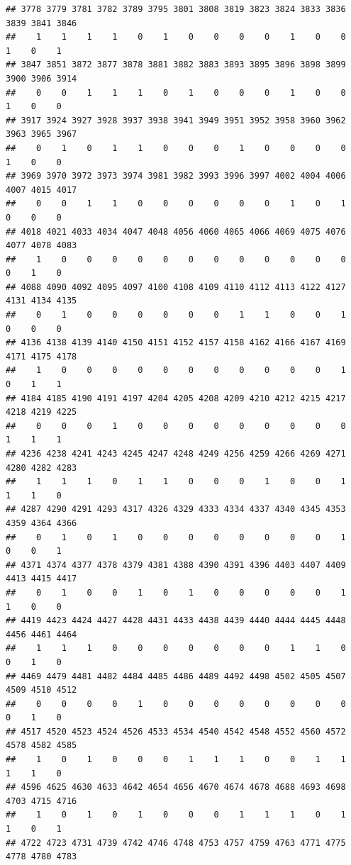 \documentclass[
]{article}
\begin{document}
\begin{verbatim}
## 3778 3779 3781 3782 3789 3795 3801 3808 3819 3823 3824 3833 3836 3839 3841 3846 
##    1    1    1    1    0    1    0    0    0    0    1    0    0    1    0    1 
## 3847 3851 3872 3877 3878 3881 3882 3883 3893 3895 3896 3898 3899 3900 3906 3914 
##    0    0    1    1    1    0    1    0    0    0    1    0    0    1    0    0 
## 3917 3924 3927 3928 3937 3938 3941 3949 3951 3952 3958 3960 3962 3963 3965 3967 
##    0    1    0    1    1    0    0    0    1    0    0    0    0    1    0    0 
## 3969 3970 3972 3973 3974 3981 3982 3993 3996 3997 4002 4004 4006 4007 4015 4017 
##    0    0    1    1    0    0    0    0    0    0    1    0    1    0    0    0 
## 4018 4021 4033 4034 4047 4048 4056 4060 4065 4066 4069 4075 4076 4077 4078 4083 
##    1    0    0    0    0    0    0    0    0    0    0    0    0    0    1    0 
## 4088 4090 4092 4095 4097 4100 4108 4109 4110 4112 4113 4122 4127 4131 4134 4135 
##    0    1    0    0    0    0    0    0    1    1    0    0    1    0    0    0 
## 4136 4138 4139 4140 4150 4151 4152 4157 4158 4162 4166 4167 4169 4171 4175 4178 
##    1    0    0    0    0    0    0    0    0    0    0    0    1    0    1    1 
## 4184 4185 4190 4191 4197 4204 4205 4208 4209 4210 4212 4215 4217 4218 4219 4225 
##    0    0    0    1    0    0    0    0    0    0    0    0    0    1    1    1 
## 4236 4238 4241 4243 4245 4247 4248 4249 4256 4259 4266 4269 4271 4280 4282 4283 
##    1    1    1    0    1    1    0    0    0    1    0    0    1    1    1    0 
## 4287 4290 4291 4293 4317 4326 4329 4333 4334 4337 4340 4345 4353 4359 4364 4366 
##    0    1    0    1    0    0    0    0    0    0    0    0    1    0    0    1 
## 4371 4374 4377 4378 4379 4381 4388 4390 4391 4396 4403 4407 4409 4413 4415 4417 
##    0    1    0    0    1    0    1    0    0    0    0    0    1    1    0    0 
## 4419 4423 4424 4427 4428 4431 4433 4438 4439 4440 4444 4445 4448 4456 4461 4464 
##    1    1    1    0    0    0    0    0    0    0    1    1    0    0    1    0 
## 4469 4479 4481 4482 4484 4485 4486 4489 4492 4498 4502 4505 4507 4509 4510 4512 
##    0    0    0    0    1    0    0    0    0    0    0    0    0    0    1    0 
## 4517 4520 4523 4524 4526 4533 4534 4540 4542 4548 4552 4560 4572 4578 4582 4585 
##    1    0    1    0    0    0    1    1    1    0    0    1    1    1    1    0 
## 4596 4625 4630 4633 4642 4654 4656 4670 4674 4678 4688 4693 4698 4703 4715 4716 
##    1    0    1    0    1    0    0    0    1    1    1    0    1    1    0    1 
## 4722 4723 4731 4739 4742 4746 4748 4753 4757 4759 4763 4771 4775 4778 4780 4783 

\end{verbatim}
\end{document}
